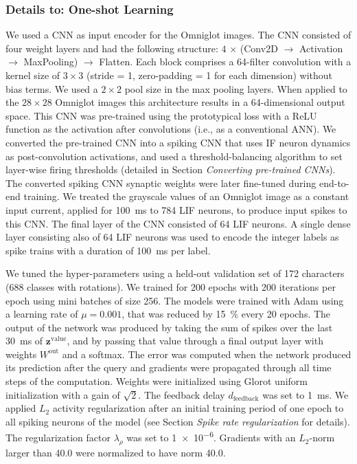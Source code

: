 \documentclass{article}
\newcommand{\vm}[1]{\bm{#1}}
\begin{document}
\subsubsection*{Details to: One-shot Learning}
We used a \gls{CNN} as input encoder for the Omniglot images.
The \gls{CNN} consisted of four weight layers and had the following structure: $4$ $\times$ (Conv2D $\rightarrow$ Activation $\rightarrow$ MaxPooling) $\rightarrow$ Flatten. Each block comprises a \num{64}-filter convolution with a kernel size of $3 \times 3$ (stride = \num{1}, zero-padding = \num{1} for each dimension) without bias terms. We used a $2 \times 2$ pool size in the max pooling layers. 
When applied to the $28 \times 28$ Omniglot images this architecture results in a \num{64}-dimensional output space. 
This \gls{CNN} was pre-trained using the prototypical loss \cite{snell2017prototypical} with a ReLU function as the activation after convolutions (i.e., as a conventional \gls{ANN}).
We converted the pre-trained \gls{CNN} into a spiking \gls{CNN} that uses \gls{IF} neuron dynamics as post-convolution activations, and used a threshold-balancing algorithm to set layer-wise firing thresholds \cite{diehl2015fast,sengupta2019going} (detailed in Section \emph{Converting pre-trained CNNs}).
The converted spiking \gls{CNN} synaptic weights were later fine-tuned during end-to-end training.
We treated the grayscale values of an Omniglot image as a constant input current, applied for \SI{100}{\ms} to \num{784} \gls{LIF} neurons, to produce input spikes to this \gls{CNN}.
The final layer of the \gls{CNN} consisted of \num{64} \gls{LIF} neurons. 
A single dense layer consisting also of \num{64} \gls{LIF} neurons was used to encode the integer labels as spike trains with a duration of \SI{100}{\ms} per label.

We tuned the hyper-parameters using a held-out validation set of \num{172} characters (\num{688} classes with rotations). We trained for \num{200} epochs with \num{200} iterations per epoch using mini batches of size \num{256}. The models were trained with Adam \cite{kingma2014adam} using a learning rate of $\mu = 0.001$, that was reduced by \SI{15}{\percent} every \num{20} epochs. The output of the network was produced by taking the sum of spikes over the last \SI{30}{ms} of $\vm{z}^\mathrm{value}$, and by passing that value through a final output layer with weights $W^\mathrm{out}$ and a softmax. The error was computed when the network produced its prediction after the query and gradients were propagated through all time steps of the computation. Weights were initialized using Glorot uniform initialization \cite{glorot2010understanding} with a gain of $\sqrt{2}$. The feedback delay $d_{\mathrm{feedback}}$ was set to \SI{1}{ms}. We applied $L_2$ activity regularization after an initial training period of one epoch to all spiking neurons of the model (see Section \emph{Spike rate regularization} for details). The regularization factor $\lambda_{\rho}$ was set to \num{1e-6}. Gradients with an $L_2$-norm larger than \num{40.0} were normalized to have norm \num{40.0}.
\end{document}
